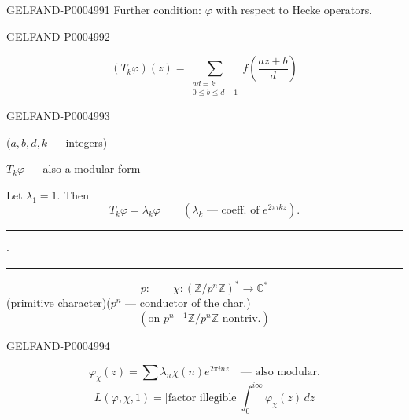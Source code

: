 \begin{GelfandAdjacentEvidence}{GELFAND-P000499}{1}
Further condition: $\varphi$  with respect to
 Hecke operators.
\end{GelfandAdjacentEvidence}
\begin{GelfandAdjacentEvidence}{GELFAND-P000499}{2}


\[
(T_k\varphi)(z)=\sum_{\substack{ad=k\\0\le b\le d-1}}
f\left(\frac{az+b}{d}\right)
\]
\end{GelfandAdjacentEvidence}
\begin{GelfandAdjacentEvidence}{GELFAND-P000499}{3}

($a,b,d,k$ — integers)

$T_k\varphi$ — also a modular form

Let $\lambda_1=1$. Then
\[
T_k\varphi=\lambda_k\varphi\qquad
(\lambda_k\text{ — coeff. of }e^{2\pi ikz}).
\]
\begin{center}\rule{1.4cm}{0.3pt}\quad$\cdot$\quad\rule{1.6cm}{0.3pt}\end{center}

\[
p:\qquad\chi:(\mathbb{Z}/p^n\mathbb{Z})^*\to\mathbb{C}^*
\]
(primitive character)\qquad($p^n$ — conductor of the char.)
\[
(\text{on }p^{n-1}\mathbb{Z}/p^n\mathbb{Z}\text{ nontriv.})
\]
\end{GelfandAdjacentEvidence}
\begin{GelfandAdjacentEvidence}{GELFAND-P000499}{4}


\[
\varphi_\chi(z)=\sum\lambda_n\chi(n)e^{2\pi inz}
\quad\text{— also modular.}
\]
\[
L(\varphi,\chi,1)=\text{[factor illegible]}\int_0^{i\infty}\varphi_\chi(z)\,dz
\]
\end{GelfandAdjacentEvidence}
